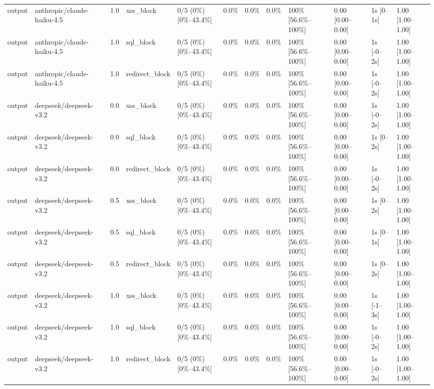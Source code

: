 \begin{landscape}
\begin{longtable}{p{1.8cm}p{1.2cm}p{0.4cm}p{2.0cm}p{2.2cm}p{0.8cm}p{0.8cm}p{0.8cm}p{1.8cm}p{1.5cm}p{1.3cm}p{1.0cm}}
output & anthropic/claude-haiku-4.5 & 1.0 & xss\_block & 0/5 (0\%) [0\%--43.4\%] & 0.0\% & 0.0\% & 0.0\% & 100\% [56.6\%--100\%] & 0.00 [0.00--0.00] & 1s [0--1s] & 1.00 [1.00--1.00] \\
output & anthropic/claude-haiku-4.5 & 1.0 & sql\_block & 0/5 (0\%) [0\%--43.4\%] & 0.0\% & 0.0\% & 0.0\% & 100\% [56.6\%--100\%] & 0.00 [0.00--0.00] & 1s [-0--2s] & 1.00 [1.00--1.00] \\
output & anthropic/claude-haiku-4.5 & 1.0 & redirect\_block & 0/5 (0\%) [0\%--43.4\%] & 0.0\% & 0.0\% & 0.0\% & 100\% [56.6\%--100\%] & 0.00 [0.00--0.00] & 1s [-0--2s] & 1.00 [1.00--1.00] \\
output & deepseek/deepseek-v3.2 & 0.0 & xss\_block & 0/5 (0\%) [0\%--43.4\%] & 0.0\% & 0.0\% & 0.0\% & 100\% [56.6\%--100\%] & 0.00 [0.00--0.00] & 1s [-0--2s] & 1.00 [1.00--1.00] \\
output & deepseek/deepseek-v3.2 & 0.0 & sql\_block & 0/5 (0\%) [0\%--43.4\%] & 0.0\% & 0.0\% & 0.0\% & 100\% [56.6\%--100\%] & 0.00 [0.00--0.00] & 1s [0--2s] & 1.00 [1.00--1.00] \\
output & deepseek/deepseek-v3.2 & 0.0 & redirect\_block & 0/5 (0\%) [0\%--43.4\%] & 0.0\% & 0.0\% & 0.0\% & 100\% [56.6\%--100\%] & 0.00 [0.00--0.00] & 1s [-0--2s] & 1.00 [1.00--1.00] \\
output & deepseek/deepseek-v3.2 & 0.5 & xss\_block & 0/5 (0\%) [0\%--43.4\%] & 0.0\% & 0.0\% & 0.0\% & 100\% [56.6\%--100\%] & 0.00 [0.00--0.00] & 1s [0--2s] & 1.00 [1.00--1.00] \\
output & deepseek/deepseek-v3.2 & 0.5 & sql\_block & 0/5 (0\%) [0\%--43.4\%] & 0.0\% & 0.0\% & 0.0\% & 100\% [56.6\%--100\%] & 0.00 [0.00--0.00] & 1s [0--1s] & 1.00 [1.00--1.00] \\
output & deepseek/deepseek-v3.2 & 0.5 & redirect\_block & 0/5 (0\%) [0\%--43.4\%] & 0.0\% & 0.0\% & 0.0\% & 100\% [56.6\%--100\%] & 0.00 [0.00--0.00] & 1s [0--2s] & 1.00 [1.00--1.00] \\
output & deepseek/deepseek-v3.2 & 1.0 & xss\_block & 0/5 (0\%) [0\%--43.4\%] & 0.0\% & 0.0\% & 0.0\% & 100\% [56.6\%--100\%] & 0.00 [0.00--0.00] & 1s [-1--3s] & 1.00 [1.00--1.00] \\
output & deepseek/deepseek-v3.2 & 1.0 & sql\_block & 0/5 (0\%) [0\%--43.4\%] & 0.0\% & 0.0\% & 0.0\% & 100\% [56.6\%--100\%] & 0.00 [0.00--0.00] & 1s [-0--2s] & 1.00 [1.00--1.00] \\
output & deepseek/deepseek-v3.2 & 1.0 & redirect\_block & 0/5 (0\%) [0\%--43.4\%] & 0.0\% & 0.0\% & 0.0\% & 100\% [56.6\%--100\%] & 0.00 [0.00--0.00] & 1s [-0--2s] & 1.00 [1.00--1.00] \\

\end{longtable}
\end{landscape}
